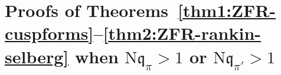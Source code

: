 \documentclass[12pt,reqno]{amsart}
\renewcommand{\tilde}{\widetilde}
\theoremstyle{remark}
\renewcommand{\tilde}{\widetilde}
\DeclareMathOperator{\Real}{Re}
\renewcommand{\tilde}{\widetilde}
\newcommand{\N}{\mathrm{N}}
\newcommand{\kp}{\mathfrak{p}}
\newcommand{\kq}{\mathfrak{q}}
\numberwithin{equation}{section}
\begin{document}
	
	
    \section{Proofs of Theorems~\ref{thm1:ZFR-cuspforms}--\ref{thm2:ZFR-rankin-selberg} when \texorpdfstring{$\N\kq_{\pi} > 1$}{N2} or \texorpdfstring{$\N\kq_{\pi'} > 1$}{N3}}\label{sec:proof-level>1}

        
\end{document}
